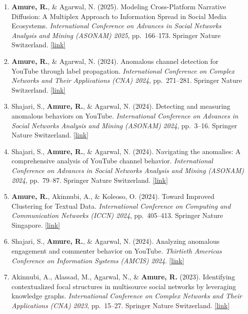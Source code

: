 \documentclass[11pt, letterpaper]{article}
\newcommand{\pubentry}[1]{%
  \item #1
}
\begin{document}
\begin{enumerate}[leftmargin=1.5em, itemsep=5pt, topsep=4pt]
  \pubentry{%
    \textbf{Amure, R.}, \& Agarwal, N. (2025).
    Modeling Cross-Platform Narrative Diffusion: A Multiplex Approach to Information Spread in Social Media Ecosystems.
    \textit{International Conference on Advances in Social Networks Analysis and Mining (ASONAM) 2025}, pp.\ 166--173. Springer Nature Switzerland.
    \href{https://link.springer.com/chapter/10.1007/978-3-032-13513-1_14}{[link]}
  }

  \pubentry{%
    \textbf{Amure, R.}, \& Agarwal, N. (2024).
    Anomalous channel detection for YouTube through label propagation.
    \textit{International Conference on Complex Networks and Their Applications (CNA) 2024}, pp.\ 271--281. Springer Nature Switzerland.
    \href{https://link.springer.com/chapter/10.1007/978-3-031-82435-7_22}{[link]}
  }

  \pubentry{%
    Shajari, S., \textbf{Amure, R.}, \& Agarwal, N. (2024).
    Detecting and measuring anomalous behaviors on YouTube.
    \textit{International Conference on Advances in Social Networks Analysis and Mining (ASONAM) 2024}, pp.\ 3--16. Springer Nature Switzerland.
    \href{https://link.springer.com/chapter/10.1007/978-3-031-85386-9_1}{[link]}
  }

  \pubentry{%
    Shajari, S., \textbf{Amure, R.}, \& Agarwal, N. (2024).
    Navigating the anomalies: A comprehensive analysis of YouTube channel behavior.
    \textit{International Conference on Advances in Social Networks Analysis and Mining (ASONAM) 2024}, pp.\ 79--87. Springer Nature Switzerland.
    \href{https://link.springer.com/chapter/10.1007/978-3-031-85240-4_8}{[link]}
  }

  \pubentry{%
    \textbf{Amure, R.}, Akinnubi, A., \& Koleoso, O. (2024).
    Toward Improved Clustering for Textual Data.
    \textit{International Conference on Computing and Communication Networks (ICCN) 2024}, pp.\ 405--413. Springer Nature Singapore.
    \href{https://link.springer.com/chapter/10.1007/978-981-97-0892-5_32}{[link]}
  }

  \pubentry{%
    Shajari, S., \textbf{Amure, R.}, \& Agarwal, N. (2024).
    Analyzing anomalous engagement and commenter behavior on YouTube.
    \textit{Thirtieth Americas Conference on Information Systems (AMCIS) 2024}.
    \href{https://aisel.aisnet.org/amcis2024/social_comp/social_comput/6/}{[link]}
  }

  \pubentry{%
    Akinnubi, A., Alassad, M., Agarwal, N., \& \textbf{Amure, R.} (2023).
    Identifying contextualized focal structures in multisource social networks by leveraging knowledge graphs.
    \textit{International Conference on Complex Networks and Their Applications (CNA) 2023}, pp.\ 15--27. Springer Nature Switzerland.
    \href{https://link.springer.com/chapter/10.1007/978-3-031-53472-0_2}{[link]}
  }

\end{enumerate}
\end{document}
